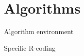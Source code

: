 \section{Algorithms}

\begin{frame}{Algorithm environment}
\end{frame}

\begin{frame}{Specific R-coding}
\end{frame}